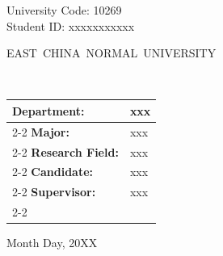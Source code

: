 \newpage

\pagestyle{empty}

\newline
\hspace*{\fill} {University Code: 10269}\\
\hspace*{\fill} {Student ID: 
xxxxxxxxxxx
}%

\vskip 2cm

\begin{center}
    {\yihao {}\mdseries\mbox{EAST CHINA NORMAL UNIVERSITY}}
\end{center}

\vskip 3cm

\begin{center}
    {\fontsize{16.4pt}{24pt}\selectfont\bfseries \thesisETitle}\\
\end{center}

\vskip 2cm {\sihao
        \begin{center}
            \renewcommand\arraystretch{1.15}
            \begin{tabular}{l >{\centering\arraybackslash}p{8.5cm}}
                \bfseries Department: & xxx \\ \cline{2-2}
                \bfseries Major: & xxx \\ \cline{2-2}
                \bfseries Research Field: & xxx \\ \cline{2-2}
                \bfseries Candidate: & xxx \\ \cline{2-2}
                \bfseries Supervisor: & xxx \\ \cline{2-2}
            \end{tabular}
        \end{center}}

\vfill

\begin{center}
    {\fontsize{16pt}{20pt}\selectfont Month Day, 20XX}
\end{center}
